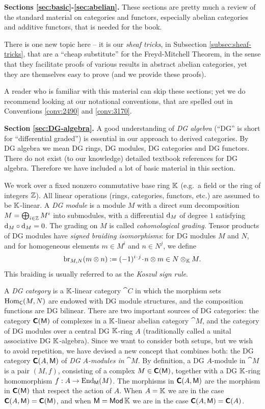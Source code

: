 \medskip \noindent 
{\bf Sections \ref{sec:basic}-\ref{sec:abelian}.} These sections are pretty 
much a review of the standard material on categories and functors, especially 
abelian categories and additive functors, that is needed for the book. 

There is one new topic here -- it is our {\em sheaf tricks}, in Subsection 
\ref{subsec:sheaf-tricks}, that are a ``cheap substitute'' for the 
Freyd-Mitchell Theorem, in the sense that they facilitate proofs of various 
results in abstract abelian categories, yet they are themselves easy to prove 
(and we provide these proofs). 

A reader who is familiar with this material can skip these sections; yet we 
do recommend looking at our notational conventions, that are spelled out in 
Conventions \ref{conv:2490} and \ref{conv:3170}. 

\medskip \noindent 
{\bf Section \ref{sec:DG-algebra}.} A good understanding of {\em DG algebra} 
(``DG'' is short for ``differential graded'') is essential in our approach to 
derived categories. By DG algebra we mean DG rings, DG modules, DG categories 
and DG functors. There do not exist (to our knowledge) detailed textbook 
references for DG algebra. Therefore we have included a lot of basic material 
in this section.

We work over a fixed nonzero commutative base ring $\mathbb{K}$ (e.g.\ a field or the 
ring of integers $\mathbb{Z}$). All linear operations (rings, categories, functors, 
etc.) are assumed to be $\mathbb{K}$-linear. A {\em DG module} 
is a module $M$ with a direct sum decomposition 
$M = \bigoplus\nolimits_{i \in \mathbb{Z}} M^i$ into submodules, with a differential $\mathrm{d}_M$ of 
degree $1$ satisfying $\mathrm{d}_M \circ \mathrm{d}_M = 0$. The grading on $M$ is called  
{\em cohomological grading}. 
Tensor products of DG modules have {\em signed braiding isomorphisms}: for 
DG modules $M$ and $N$, and for homogeneous elements 
$m \in M^i$ and $n \in N^j$, we define 
\[ \operatorname{br}_{M, N}(m \otimes n) := (-1)^{i \mspace{1.5mu}{\cdot}\mspace{1.5mu} j} \mspace{1.5mu}{\cdot}\mspace{1.5mu} n \otimes m \in N \otimes_{\mathbb{K}} M . \]
This braiding is usually referred to as the {\em Koszul sign rule}. 

A {\em DG category} is a $\mathbb{K}$-linear
category $\cat{C}$ in which the morphism sets 
$\operatorname{Hom}_{\operatorname{\mathsf{C}}}(M, N)$ are endowed with DG module structures, 
and the composition functions are DG bilinear.  
There are two important sources of DG categories: the category 
$\boldsymbol{\mathsf{C}}(\operatorname{\mathsf{M}})$ of complexes in a $\mathbb{K}$-linear abelian category $\cat{M}$,
and the category of DG modules over a central DG $\mathbb{K}$-ring $A$
(traditionally called a unital associative DG $\mathbb{K}$-algebra).
Since we want to consider both setups, but we wish to avoid repetition, we 
have devised a new concept that combines both: the DG category 
$\boldsymbol{\mathsf{C}}(A, \operatorname{\mathsf{M}})$ of {\em DG $A$-modules in $\cat{M}$}. 
By definition, a DG $A$-module in $\cat{M}$ is a pair $(M, f)$, consisting of a 
complex $M \in \boldsymbol{\mathsf{C}}(\operatorname{\mathsf{M}})$, together with a DG $\mathbb{K}$-ring homomorphism 
$f : A \to \operatorname{End}_{\operatorname{\mathsf{M}}}(M)$.
The morphisms in $\boldsymbol{\mathsf{C}}(A, \operatorname{\mathsf{M}})$ are the morphism in 
$\boldsymbol{\mathsf{C}}(\operatorname{\mathsf{M}})$ that respect the action of $A$. 
When $A = \mathbb{K}$ we are in the case 
$\boldsymbol{\mathsf{C}}(A, \operatorname{\mathsf{M}}) = \boldsymbol{\mathsf{C}}(\operatorname{\mathsf{M}})$, and when 
$\operatorname{\mathsf{M}} = \operatorname{\mathsf{Mod}} \mathbb{K}$ we are in the case 
$\boldsymbol{\mathsf{C}}(A, \operatorname{\mathsf{M}}) = \boldsymbol{\mathsf{C}}(A)$. 

